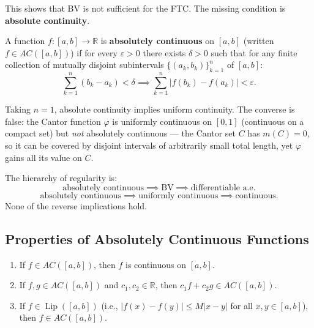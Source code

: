 \documentclass[11pt]{report}
\begin{document}
\begin{rembox}
This shows that BV is not sufficient for the FTC. The missing condition is \textbf{absolute continuity}.
\end{rembox}

\begin{defbox}
A function $f: [a, b] \to \mathbb{R}$ is \textbf{absolutely continuous} on $[a, b]$ (written $f \in AC([a, b])$) if for every $\varepsilon > 0$ there exists $\delta > 0$ such that for any finite collection of mutually disjoint subintervals $\{(a_k, b_k)\}_{k=1}^{n}$ of $[a, b]$:
\[
\sum_{k=1}^{n} (b_k - a_k) < \delta \implies \sum_{k=1}^{n} |f(b_k) - f(a_k)| < \varepsilon.
\]
\end{defbox}

\begin{rembox}
Taking $n = 1$, absolute continuity implies uniform continuity. The converse is false: the Cantor function $\varphi$ is uniformly continuous on $[0, 1]$ (continuous on a compact set) but \textit{not} absolutely continuous --- the Cantor set $C$ has $m(C) = 0$, so it can be covered by disjoint intervals of arbitrarily small total length, yet $\varphi$ gains all its value on $C$.

The hierarchy of regularity is:
\[
\text{absolutely continuous} \implies \text{BV} \implies \text{differentiable a.e.}
\]
\[
\text{absolutely continuous} \implies \text{uniformly continuous} \implies \text{continuous.}
\]
None of the reverse implications hold.
\end{rembox}

\subsection{Properties of Absolutely Continuous Functions}

\begin{propbox}
\begin{enumerate}[label=(\roman*)]
\item If $f \in AC([a, b])$, then $f$ is continuous on $[a, b]$.
\item If $f, g \in AC([a, b])$ and $c_1, c_2 \in \mathbb{R}$, then $c_1 f + c_2 g \in AC([a, b])$.
\item If $f \in \operatorname{Lip}([a, b])$ (i.e., $|f(x) - f(y)| \leq M|x - y|$ for all $x, y \in [a, b]$), then $f \in AC([a, b])$.
\end{enumerate}
\end{propbox}
\end{document}
